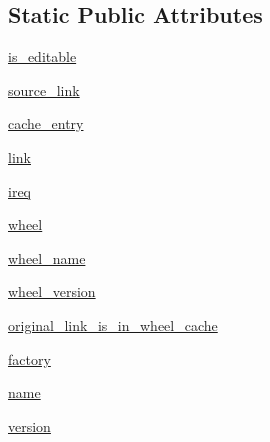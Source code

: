 \subsection*{Static Public Attributes}
\begin{DoxyCompactItemize}
\item 
\hyperlink{classpip_1_1__internal_1_1resolution_1_1resolvelib_1_1candidates_1_1LinkCandidate_a4e2406445bd5f6468ff92aa533609ea6}{is\+\_\+editable}
\item 
\hyperlink{classpip_1_1__internal_1_1resolution_1_1resolvelib_1_1candidates_1_1LinkCandidate_a49d8a45bf1f917d32e6be663c6f13902}{source\+\_\+link}
\item 
\hyperlink{classpip_1_1__internal_1_1resolution_1_1resolvelib_1_1candidates_1_1LinkCandidate_adeb7135973ee1cc27f3c8ac137a86108}{cache\+\_\+entry}
\item 
\hyperlink{classpip_1_1__internal_1_1resolution_1_1resolvelib_1_1candidates_1_1LinkCandidate_a5f49003b3c5991a45c179bfdb0cee680}{link}
\item 
\hyperlink{classpip_1_1__internal_1_1resolution_1_1resolvelib_1_1candidates_1_1LinkCandidate_abca2c0eff8cf80ed59874bcbb4d38006}{ireq}
\item 
\hyperlink{classpip_1_1__internal_1_1resolution_1_1resolvelib_1_1candidates_1_1LinkCandidate_aeb7089e491ed48093875ab15f0845e43}{wheel}
\item 
\hyperlink{classpip_1_1__internal_1_1resolution_1_1resolvelib_1_1candidates_1_1LinkCandidate_a7ab09dae7b746cb8511951c1980717c0}{wheel\+\_\+name}
\item 
\hyperlink{classpip_1_1__internal_1_1resolution_1_1resolvelib_1_1candidates_1_1LinkCandidate_a4c6c47f983abde972171c20ed9dceeca}{wheel\+\_\+version}
\item 
\hyperlink{classpip_1_1__internal_1_1resolution_1_1resolvelib_1_1candidates_1_1LinkCandidate_af1c86c03a141b92e2b04eb9f23d492db}{original\+\_\+link\+\_\+is\+\_\+in\+\_\+wheel\+\_\+cache}
\item 
\hyperlink{classpip_1_1__internal_1_1resolution_1_1resolvelib_1_1candidates_1_1LinkCandidate_a4f57b95407e093fe83dea3930a21543a}{factory}
\item 
\hyperlink{classpip_1_1__internal_1_1resolution_1_1resolvelib_1_1candidates_1_1LinkCandidate_a1bc1ede67106c3a06cb1601342a50840}{name}
\item 
\hyperlink{classpip_1_1__internal_1_1resolution_1_1resolvelib_1_1candidates_1_1LinkCandidate_a34dc697aa49cd40a843613524c0e31e0}{version}
\end{DoxyCompactItemize}


